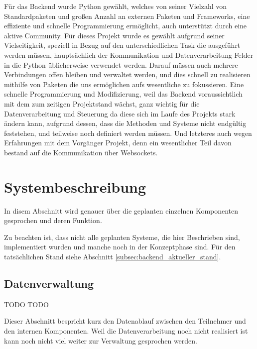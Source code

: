Für das Backend wurde Python gewählt, 
welches von seiner Vielzahl von Standardpaketen und 
großen Anzahl an externen Paketen und Frameworks, 
eine effiziente und schnelle Programmierung ermöglicht, 
auch unterstützt durch eine aktive Community.
% 
Für dieses Projekt wurde es gewählt aufgrund seiner Vielseitigkeit, 
speziell in Bezug auf den unterschiedlichen Task die ausgeführt werden müssen, 
hauptsächlich der Kommunikation und Datenverarbeitung 
Felder in die Python üblicherweise verwendet werden.
% 
Darauf müssen auch mehrere Verbindungen offen bleiben und verwaltet werden,
und dies schnell zu realisieren mithilfe von Paketen 
die uns ermöglichen aufs wesentliche zu fokussieren.
% 
Eine schnelle Programmierung und Modifizierung, 
weil das Backend voraussichtlich mit dem zum zeitigen Projektstand wächst, 
ganz wichtig für die Datenverarbeitung und Steuerung 
da diese sich im Laufe des Projekts stark ändern kann,
aufgrund dessen, dass die Methoden und Systeme nicht endgültig feststehen, 
und teilweise noch definiert werden müssen.
% 
Und letzteres auch wegen Erfahrungen mit dem Vorgänger Projekt, 
denn ein wesentlicher Teil davon bestand auf die Kommunikation über Websockets.
\section{Systembeschreibung}
In disem Abschnitt wird genauer 
über die geplanten einzelnen Komponenten gesprochen 
und deren Funktion.

Zu beachten ist, dass nicht alle geplanten Systeme, die hier Beschrieben sind,
implementiert wurden und manche noch in der Konzeptphase sind.
Für den tatsächlichen Stand siehe Abschnitt \ref{subsec:backend_aktueller_stand}.

\subsection{Datenverwaltung}
\label{subsec:backend_data}
TODO
TODO

Dieser Abschnitt bespricht kurz den Datenablauf 
zwischen den Teilnehmer und den internen Komponenten.
% 
Weil die Datenverarbeitung noch nicht realisiert ist 
kann noch nicht viel weiter zur Verwaltung gesprochen werden.

